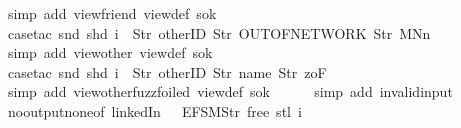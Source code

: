 \begin{isabellebody}
\ {\isacharparenleft}simp\ add{\isacharcolon}\ view{\isacharunderscore}friend\ view{\isacharunderscore}def\ s{}{\isacharunderscore}ok{\isacharparenright}\isanewline
\ \ \ \ \isamarkupfalse%
\ {\isacharparenleft}case{\isacharunderscore}tac\ {\isachardoublequoteopen}{\isacharparenleft}snd\ {\isacharparenleft}shd\ i{\isacharparenright}{\isacharparenright}\ {\isacharequal}\ {\isacharbrackleft}Str\ {\isacharprime}{\isacharprime}otherID{\isacharprime}{\isacharprime}{\isacharcomma}\ Str\ {\isacharprime}{\isacharprime}OUT{\isacharunderscore}OF{\isacharunderscore}NETWORK{\isacharprime}{\isacharprime}{\isacharcomma}\ Str\ {\isacharprime}{\isacharprime}MNn{}{\isacharprime}{\isacharprime}{\isacharbrackright}{\isachardoublequoteclose}{\isacharparenright}\isanewline
\ \ \ \ \ \isamarkupfalse%
\ {\isacharparenleft}simp\ add{\isacharcolon}\ view{\isacharunderscore}other\ view{}{\isacharunderscore}def\ s{}{\isacharunderscore}ok{\isacharparenright}\isanewline
\ \ \ \ \isamarkupfalse%
\ {\isacharparenleft}case{\isacharunderscore}tac\ {\isachardoublequoteopen}{\isacharparenleft}snd\ {\isacharparenleft}shd\ i{\isacharparenright}{\isacharparenright}\ {\isacharequal}\ {\isacharbrackleft}Str\ {\isacharprime}{\isacharprime}otherID{\isacharprime}{\isacharprime}{\isacharcomma}\ Str\ {\isacharprime}{\isacharprime}name{\isacharprime}{\isacharprime}{\isacharcomma}\ Str\ {\isacharprime}{\isacharprime}{}zoF{\isacharprime}{\isacharprime}{\isacharbrackright}{\isachardoublequoteclose}{\isacharparenright}\isanewline
\ \ \ \ \ \isamarkupfalse%
\ {\isacharparenleft}simp\ add{\isacharcolon}\ view{\isacharunderscore}other{\isacharunderscore}fuzz{\isacharunderscore}foiled\ view{}{\isacharunderscore}def\ s{}{\isacharunderscore}ok{\isacharparenright}\isanewline
\ \ \ \ \isamarkupfalse%
\ {\isacharparenleft}simp\ add{\isacharcolon}\ invalid{\isacharunderscore}input{\isacharunderscore}{}{\isacharparenright}\isanewline
\ \ \ \ \isamarkupfalse%
\ no{\isacharunderscore}output{\isacharunderscore}none{\isacharbrackleft}of\ linkedIn\ {\isachardoublequoteopen}{\isacharless}{}\ {\isacharcolon}{\isacharequal}\ EFSM{\isachardot}Str\ {\isacharprime}{\isacharprime}free{\isacharprime}{\isacharprime}{\isachargreater}{\isachardoublequoteclose}\ {\isachardoublequoteopen}{\isacharparenleft}stl\ i{\isacharparenright}{\isachardoublequoteclose}{\isacharbrackright}\isanewline
\ \ \ \ \isamarkupfalse%

\end{isabellebody}
